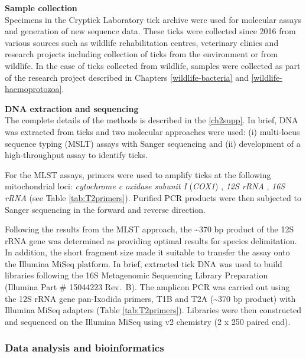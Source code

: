 \documentclass[a4paper, nobind]{templates/ociamthesis}
\begin{document}
\textbf{Sample collection}\\
Specimens in the Cryptick Laboratory tick archive were used for molecular assays and generation of new sequence data.
These ticks were collected since 2016 from various sources such as wildlife rehabilitation centres, veterinary clinics and research projects including collection of ticks from the environment or from wildlife.
In the case of ticks collected from wildlife, samples were collected as part of the research project described in Chapters \ref{wildlife-bacteria} and \ref{wildlife-haemoprotozoa}.

\textbf{DNA extraction and sequencing}\\
The complete details of the methods is described in the \ref{ch2supp}.
In brief, DNA was extracted from ticks and two molecular approaches were used: (i) multi-locus sequence typing (MSLT) assays with Sanger sequencing and (ii) development of a high-throughput assay to identify ticks.

For the MLST assays, primers were used to amplify ticks at the following mitochondrial loci: \emph{cytochrome c oxidase subunit I} (\emph{COX1}) \autocite{songPhylogeneticPhylogeographicRelationships2011}, \emph{12S rRNA} \autocite{beatiAnalysisSystematicRelationships2001}, \emph{16S rRNA} \autocite{lvDevelopmentDNABarcoding2014} (see Table \ref{tab:T2primers}).
Purified PCR products were then subjected to Sanger sequencing in the forward and reverse direction.

Following the results from the MLST approach, the \textasciitilde370 bp product of the 12S rRNA gene was determined as providing optimal results for species delimitation.
In addition, the short fragment size made it suitable to transfer the assay onto the Illumina MiSeq platform.
In brief, extracted tick DNA was used to build libraries following the 16S Metagenomic Sequencing Library Preparation (Illumina Part \# 15044223 Rev.~B).
The amplicon PCR was carried out using the 12S rRNA gene pan-Ixodida primers, T1B and T2A \autocite{beatiAnalysisSystematicRelationships2001} (\textasciitilde370 bp product) with Illumina MiSeq adapters (Table \ref{tab:T2primers}).
Libraries were then constructed and sequenced on the Illumina MiSeq using v2 chemistry (2 x 250 paired end).

\hypertarget{data-analysis-and-bioinformatics}{%
\subsubsection{Data analysis and bioinformatics}\label{data-analysis-and-bioinformatics}}
\end{document}
